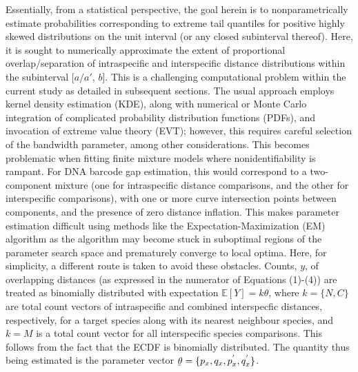 \documentclass[12pt]{article}
\begin{document}
Essentially, from a statistical perspective, the goal herein is to nonparametrically estimate probabilities corresponding to extreme tail quantiles for positive highly skewed distributions on the unit interval  (or any closed subinterval thereof). Here, it is sought to numerically approximate the extent of proportional overlap/separation of intraspecific and interspecific distance distributions within the subinterval [$a/a'$, $b$]. This is a challenging computational problem within the current study as detailed in subsequent sections. The usual approach employs kernel density estimation (KDE), along with numerical or Monte Carlo integration of complicated probability distribution functions (PDFs), and invocation of extreme value theory (EVT); however, this requires careful selection of the bandwidth parameter, among other considerations. This becomes problematic when fitting finite mixture models where nonidentifiability is rampant. For DNA barcode gap estimation, this would correspond to a two-component mixture (one for intraspecific distance comparisons, and the other for interspecific comparisons), with one or more curve intersection points between components, and the presence of zero distance inflation. This makes parameter estimation difficult using methods like the Expectation-Maximization (EM) algorithm \citep{dempster1977maximum} as the algorithm may become stuck in suboptimal regions of the parameter search space and prematurely converge to local optima. Here, for simplicity, a different route is taken to avoid these obstacles. Counts, $y$, of overlapping distances (as expressed in the numerator of Equations (1)-(4)) are treated as binomially distributed with expectation $\mathbb{E}[Y] = k\theta$, where $k = \{N, C\}$ are total count vectors of intraspecific and combined interspecfic distances, respectively, for a target species along with its nearest neighbour species, and $k = M$ is a total count vector for all interspecific species comparisons. This follows from the fact that the ECDF is binomially distributed. The quantity thus being estimated is the parameter vector $\underaccent{\bar}{\theta} = \{p_x, q_x, p^{'}_x, q^{'}_x\}$. 
\end{document}
